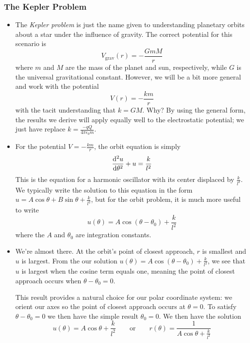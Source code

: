 \documentclass[11pt, a4paper]{article}
\newcommand{\eqtext}[1]{\qquad \text{#1} \qquad}
\begin{document}
\subsubsection{The Kepler Problem}
\begin{itemize}
	\item The \textit{Kepler problem} is just the name given to understanding planetary orbits about a star under the influence of gravity. The correct potential for this scenario is
	\begin{equation*}
		V_{\text{grav}}(r) = -\frac{GmM}{r}
	\end{equation*}
	where $ m $ and $ M $ are the mass of the planet and sun, respectively, while $ G $ is the universal gravitational constant. However, we will be a bit more general and  work with the potential
	\begin{equation*}
		V(r) = - \frac{km}{r}
	\end{equation*}
	with the tacit understanding that $ k = GM $. Why? By using the general form, the results we derive will apply equally well to the electrostatic potential; we just have replace $ k = \frac{-qQ}{4\pi \epsilon_{0}m} $.
	
	\item For the potential $ V = -\frac{km}{r} $, the orbit equation is simply
	\begin{equation*}
		\dv[2]{u}{\theta} + u = \frac{k}{l^{2}}
	\end{equation*}
	This is the equation for a harmonic oscillator with its center displaced by $ \frac{k}{l^{2}} $. We typically write the solution to this equation in the form $ u = A \cos \theta + B \sin \theta + \frac{k}{l^{2}}$, but for the orbit problem, it is much more useful to write
	\begin{equation*}
		u(\theta) = A \cos(\theta - \theta_{0}) + \frac{k}{l^{2}}
	\end{equation*}
	where the $ A $ and $ \theta_{0} $ are integration constants.
	
	\item We're almost there. At the orbit's point of closest approach, $ r $ is smallest and $ u $ is largest. From the our solution $ u(\theta) = A \cos(\theta - \theta_{0}) + \frac{k}{l^{2}} $, we see that $ u $ is largest when the cosine term equals one, meaning the point of closest approach occurs when $ \theta - \theta_{0} = 0$. 
	
	This result provides a natural choice for our polar coordinate system: we orient our axes so the point of closest approach occurs at $ \theta = 0 $. To satisfy $ \theta - \theta_{0} = 0$ we then have the simple result $ \theta_{0} = 0$. We then have the solution
	\begin{equation*}
		u(\theta) = A \cos \theta + \frac{k}{l^{2}} \eqtext{or} r(\theta) = \frac{1}{A \cos \theta + \frac{k}{l^{2}}}
	\end{equation*}
	

\end{itemize}
\end{document}
